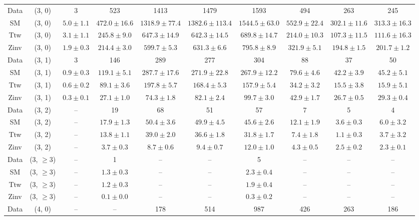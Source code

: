 \begin{table}[h!]
{\begin{tabular}{cccccccccc}
	Data & (3, 0) & 3 & 523 & 1413 & 1479 & 1593 & 494 & 263 & 245 \\[0.5ex] 
	SM & (3, 0) & $5.0\pm 1.1$ & $472.0\pm 16.6$ & $1318.9\pm 77.4$ & $1382.6\pm 113.4$ & $1544.5\pm 63.0$ & $552.9\pm 22.4$ & $302.1\pm 11.6$ & $313.3\pm 16.3$ \\[0.5ex] 
	Ttw & (3, 0) & $3.1\pm 1.1$ & $245.8\pm 9.0$ & $647.3\pm 14.9$ & $642.3\pm 14.5$ & $689.8\pm 14.7$ & $214.0\pm 10.3$ & $107.3\pm 11.5$ & $111.6\pm 16.3$ \\[0.5ex] 
	Zinv & (3, 0) & $1.9\pm 0.3$ & $214.4\pm 3.0$ & $599.7\pm 5.3$ & $631.3\pm 6.6$ & $795.8\pm 8.9$ & $321.9\pm 5.1$ & $194.8\pm 1.5$ & $201.7\pm 1.2$ \\[0.5ex] 
	Data & (3, 1) & 3 & 146 & 289 & 277 & 304 & 88 & 37 & 50 \\[0.5ex] 
	SM & (3, 1) & $0.9\pm 0.3$ & $119.1\pm 5.1$ & $287.7\pm 17.6$ & $271.9\pm 22.8$ & $267.9\pm 12.2$ & $79.6\pm 4.6$ & $42.2\pm 3.9$ & $45.2\pm 5.1$ \\[0.5ex] 
	Ttw & (3, 1) & $0.6\pm 0.2$ & $89.1\pm 3.6$ & $197.8\pm 5.7$ & $168.4\pm 5.3$ & $157.9\pm 5.4$ & $34.2\pm 3.2$ & $15.5\pm 3.8$ & $15.9\pm 5.1$ \\[0.5ex] 
	Zinv & (3, 1) & $0.3\pm 0.1$ & $27.1\pm 1.0$ & $74.3\pm 1.8$ & $82.1\pm 2.4$ & $99.7\pm 3.0$ & $42.9\pm 1.7$ & $26.7\pm 0.5$ & $29.3\pm 0.4$ \\[0.5ex] 
	Data & (3, 2) & -- & 19 & 68 & 51 & 57 & 7 & 5 & 4 \\[0.5ex] 
	SM & (3, 2) & -- & $17.9\pm 1.3$ & $50.4\pm 3.6$ & $49.9\pm 4.5$ & $45.6\pm 2.6$ & $12.1\pm 1.9$ & $3.6\pm 0.3$ & $6.0\pm 3.2$ \\[0.5ex] 
	Ttw & (3, 2) & -- & $13.8\pm 1.1$ & $39.0\pm 2.0$ & $36.6\pm 1.8$ & $31.8\pm 1.7$ & $7.4\pm 1.8$ & $1.1\pm 0.3$ & $3.7\pm 3.2$ \\[0.5ex] 
	Zinv & (3, 2) & -- & $3.7\pm 0.3$ & $8.7\pm 0.6$ & $9.4\pm 0.7$ & $12.0\pm 1.0$ & $4.3\pm 0.5$ & $2.5\pm 0.2$ & $2.3\pm 0.1$ \\[0.5ex] 
	Data & (3, $\ge3$) & -- & 1 & -- & -- & 5 & -- & -- & -- \\[0.5ex] 
	SM & (3, $\ge3$) & -- & $1.3\pm 0.3$ & -- & -- & $2.3\pm 0.4$ & -- & -- & -- \\[0.5ex] 
	Ttw & (3, $\ge3$) & -- & $1.2\pm 0.3$ & -- & -- & $1.9\pm 0.4$ & -- & -- & -- \\[0.5ex] 
	Zinv & (3, $\ge3$) & -- & $0.1\pm 0.0$ & -- & -- & $0.3\pm 0.2$ & -- & -- & -- \\[0.5ex] 
	Data & (4, 0) & -- & -- & 178 & 514 & 987 & 426 & 263 & 186 \\[0.5ex] 

\end{tabular}}
\end{table}
